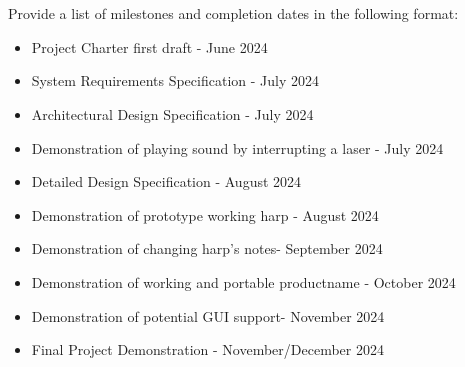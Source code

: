 \\
\\
Provide a list of milestones and completion dates in the following format:
\begin{itemize}
  \item Project Charter first draft - June 2024
  \item System Requirements Specification - July 2024
  \item Architectural Design Specification - July 2024
  \item Demonstration of playing sound by interrupting a laser - July 2024
  \item Detailed Design Specification - August 2024
  \item Demonstration of prototype working harp - August 2024
  \item Demonstration of changing harp's notes- September 2024
  \item Demonstration of working and portable productname - October 2024
  \item Demonstration of potential GUI support- November 2024
  \item Final Project Demonstration - November/December 2024
\end{itemize}
